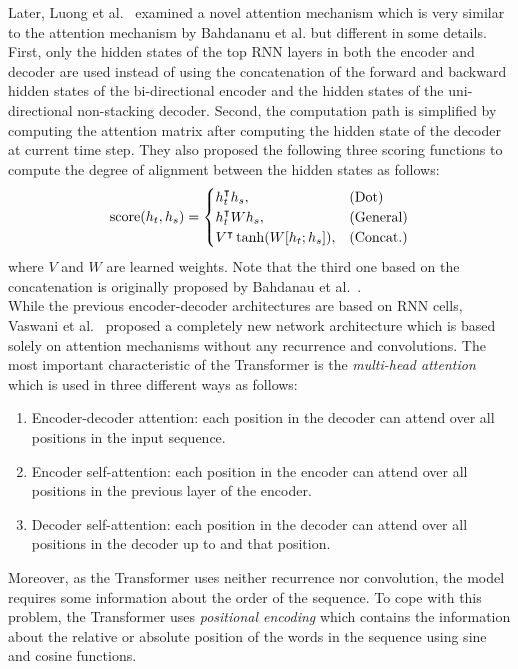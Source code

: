 \documentclass[10pt,twocolumn,letterpaper]{article}
\begin{document}
 Later, Luong et al.~\cite{LuongPM15} examined a novel attention mechanism which is very similar to the attention mechanism by Bahdananu et al. but different in some details. First, only the hidden states of the top RNN layers in both the encoder and decoder are used instead of using the concatenation of the forward and backward hidden states of the bi-directional encoder and the hidden states of the uni-directional non-stacking decoder. Second, the computation path is simplified by computing the attention matrix after computing the hidden state of the decoder at current time step. They also proposed the following three scoring functions to compute the degree of alignment between the hidden states as follows:
\[
{\rm score}(h_t, h_s) =
\begin{cases}
h_t^\intercal h_s, & \textrm{(Dot)}\\
h_t^\intercal W h_s, & \textrm{(General)} \\
V^\intercal \tanh(W [h_t ;h_s]), & \textrm{(Concat.)}
\end{cases}
\]
where $V$ and $W$ are learned weights. Note that the third one based on the concatenation is originally proposed by Bahdanau et al.~\cite{BahdanauCB14}.
\\

 While the previous encoder-decoder architectures are based on RNN cells, Vaswani et al.~\cite{VaswaniSPUJGKP17} proposed
a completely new network architecture which is based solely on attention mechanisms
without any recurrence and convolutions. The most important characteristic of the Transformer is the {\em multi-head attention} which is used in three different ways as follows:
\begin{enumerate}
    \item Encoder-decoder attention: each position in the decoder can attend over all positions in the input sequence.
    \item Encoder self-attention: each position in the encoder can attend over all positions in the previous layer of the encoder.
    \item Decoder self-attention: each position in the decoder can attend over all positions in the decoder up to and that position.
\end{enumerate}

Moreover, as the Transformer uses neither recurrence nor convolution, the model requires some information about the order of the sequence. To cope with this problem, the Transformer uses {\em positional encoding} which contains the information about the relative or absolute position of the words in the sequence using sine and cosine functions.
\end{document}
